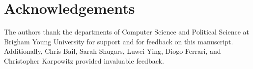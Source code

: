 \documentclass[11pt]{article}
\begin{document}
\section*{Acknowledgements}
The authors thank the departments of Computer Science and Political Science at Brigham Young University for support and for feedback on this manuscript. Additionally, Chris Bail, Sarah Shugars, Luwei Ying, Diogo Ferrari, and Christopher Karpowitz provided invaluable feedback.




%


\end{document}
